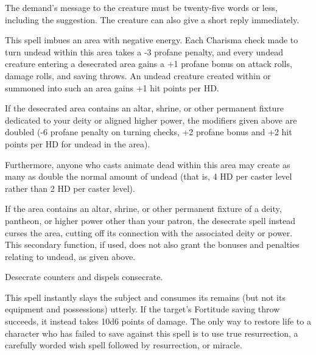 \begin{multicols}{2}
\begin{small}
\smallskip\noindent The demand's message to the creature must be twenty-five words or less, including the suggestion. The creature can also give a short reply immediately.


\noindent This spell imbues an area with negative energy. Each Charisma check made to turn undead within this area takes a -3 profane penalty, and every undead creature entering a desecrated area gains a +1 profane bonus on attack rolls, damage rolls, and saving throws. An undead creature created within or summoned into such an area gains +1 hit points per HD.

\smallskip\noindent If the desecrated area contains an altar, shrine, or other permanent fixture dedicated to your deity or aligned higher power, the modifiers given above are doubled (-6 profane penalty on turning checks, +2 profane bonus and +2 hit points per HD for undead in the area).

\smallskip\noindent Furthermore, anyone who casts animate dead within this area may create as many as double the normal amount of undead (that is, 4 HD per caster level rather than 2 HD per caster level).

\smallskip\noindent If the area contains an altar, shrine, or other permanent fixture of a deity, pantheon, or higher power other than your patron, the desecrate spell instead curses the area, cutting off its connection with the associated deity or power. This secondary function, if used, does not also grant the bonuses and penalties relating to undead, as given above.

\smallskip\noindent Desecrate counters and dispels consecrate.


\noindent This spell instantly slays the subject and consumes its remains (but not its equipment and possessions) utterly. If the target's Fortitude saving throw succeeds, it instead takes 10d6 points of damage. The only way to restore life to a character who has failed to save against this spell is to use true resurrection, a carefully worded wish spell followed by resurrection, or miracle.


\end{small}
\end{multicols}
